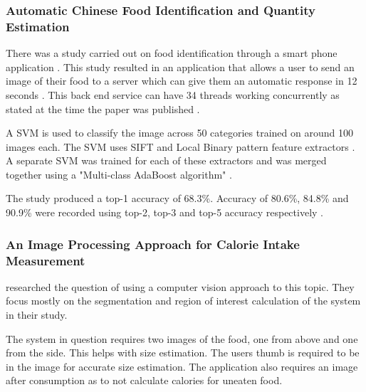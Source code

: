 
\subsubsection*{Automatic Chinese Food Identification and Quantity Estimation}
There was a study carried out on food identification through a smart phone application \textcite{chen2012automatic}. This study resulted in an application that allows a user to send an image of their food to a server which can give them an automatic response in 12 seconds \textcite{chen2012automatic}. This back end service can have 34 threads working concurrently as stated at the time the paper was published \textcite{chen2012automatic}.

A SVM is used to classify the image across 50 categories trained on around 100 images each.
The SVM uses SIFT and Local Binary pattern feature extractors \textcite{chen2012automatic}.
A separate SVM was trained for each of these extractors and was merged together using a "Multi-class AdaBoost algorithm" \textcite{chen2012automatic}.

The study produced a top-1 accuracy  of 68.3\%. Accuracy of 80.6\%, 84.8\% and 90.9\% were recorded using top-2, top-3 and top-5 accuracy respectively \textcite{chen2012automatic}. 


\subsubsection*{An Image Processing Approach for Calorie Intake Measurement}
\textcite{villalobos2012image} researched the question of using a computer vision approach to this topic. They focus mostly on the segmentation and region of interest calculation of the system in their study.

The system in question requires two images of the food, one from above and one from the side. This helps with size estimation. The users thumb is required to be in the image for accurate size estimation. The application also requires an image after consumption as to not calculate calories for uneaten food.


